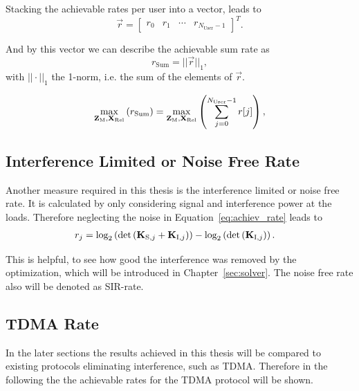 Stacking the achievable rates per user into a vector, leads to 
\begin{equation}
\label{eq:achiev_vec}
\vec{r} =
\begin{bmatrix}
r_0 & r_1 & \cdots & r_{N_\text{User}-1}
\end{bmatrix}^T.
\end{equation}

And by this vector we can describe the achievable sum rate as
\begin{equation}
\label{eq:achiev_sum_rate}
r_\text{Sum} = ||\vec{r}||_1,
\end{equation}
with $||\cdot||_1$ the 1-norm, i.e. the sum of the elements of $\vec{r}$.

\begin{equation}
\label{eq:achiev_sum_rate}
\max_{\mathbf{Z}_\text{M},\mathbf{X}_\text{Rel}}\left(r_\text{Sum}\right) = \max_{\mathbf{Z}_\text{M},\mathbf{X}_\text{Rel}}\left(\sum_{j=0}^{N_\text{User}-1} r[j]\right),
\end{equation}

\subsection{Interference Limited or Noise Free Rate}
\label{sec:sir_rate}
Another measure required in this thesis is the interference limited or noise free rate.
It is calculated by only considering signal and interference power at the loads.
Therefore neglecting the noise in Equation~\ref{eq:achiev_rate} leads to
\begin{align}
\label{eq:sir_rate}
r_j &=\text{log}_2\left(\text{det}\left(\mathbf{K}_{\text{S},j}+\mathbf{K}_{\text{I},j}\right)\right) -
	     	\text{log}_2\left(\text{det}\left(\mathbf{K}_{\text{I},j}\right)\right).
\end{align}

This is helpful, to see how good the interference was removed by the optimization, which will be introduced in Chapter~\ref{sec:solver}.
The noise free rate also will be denoted as SIR-rate.


\subsection{TDMA Rate}
\label{sec:tdma_rate}
In the later sections the results achieved in this thesis will be compared to existing protocols eliminating interference, such as TDMA.
Therefore in the following the the achievable rates for the TDMA protocol will be shown.

